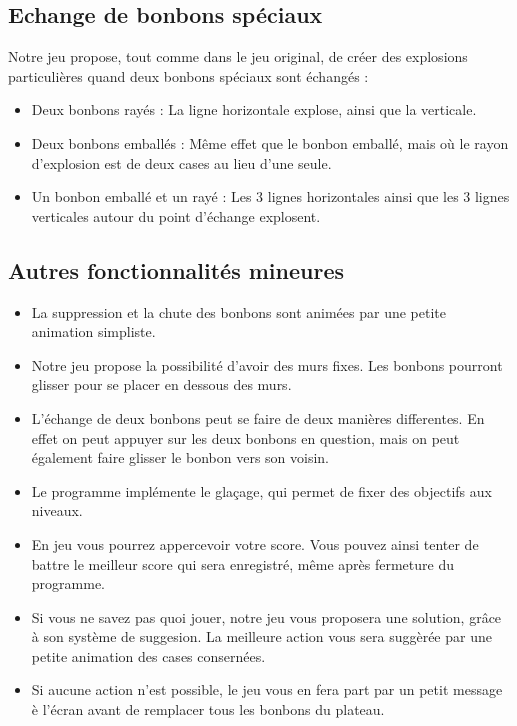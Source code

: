 \documentclass[11pt,a4paper]{article}
\begin{document}
\subsection{Echange de bonbons spéciaux}

Notre jeu propose, tout comme dans le jeu original, de créer des explosions 
particulières quand deux bonbons spéciaux sont échangés :

\begin{itemize}
	\item Deux bonbons rayés : La ligne horizontale explose, ainsi que la verticale.
	\item Deux bonbons emballés : Même effet que le bonbon emballé, mais où le rayon d'explosion est de deux cases au lieu d'une seule.
	\item Un bonbon emballé et un rayé : Les 3 lignes horizontales ainsi que les 3 lignes verticales autour du point d'échange explosent.
\end{itemize}

\subsection{Autres fonctionnalités mineures}
\begin{itemize}
	\item La suppression et la chute des bonbons sont animées par une petite animation simpliste.
	\item Notre jeu propose la possibilité d'avoir des murs fixes. Les bonbons pourront glisser pour se placer en dessous des murs.
	\item L'échange de deux bonbons peut se faire de deux manières differentes. En effet on peut appuyer sur les deux bonbons en question, mais on peut également faire glisser le bonbon vers son voisin.
	\item Le programme implémente le glaçage, qui permet de fixer des objectifs aux niveaux.
	\item En jeu vous pourrez appercevoir votre score. Vous pouvez ainsi tenter de battre le meilleur score qui sera enregistré, même après fermeture du programme.
	\item Si vous ne savez pas quoi jouer, notre jeu vous proposera une solution, grâce à son système de suggesion. La meilleure action vous sera suggèrée par une petite animation des cases consernées.
	\item Si aucune action n'est possible, le jeu vous en fera part par un petit message è l'écran avant de remplacer tous les bonbons du plateau.
\end{itemize}
\end{document}
